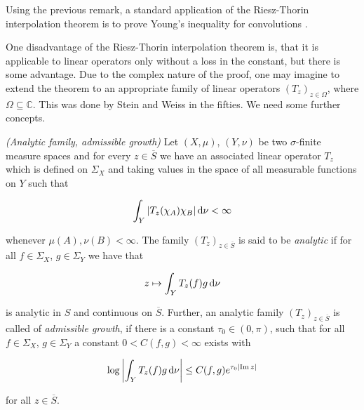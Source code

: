 \begin{remark*}
	Using the previous remark, a standard application of the Riesz-Thorin interpolation theorem is to prove Young's inequality for convolutions \textup{\cite[22--23]{grafakos:fourier:2014}}.
\end{remark*}

One disadvantage of the Riesz-Thorin interpolation theorem is, that it is applicable to linear operators only without a loss in the constant, but there is some advantage. Due to the complex nature of the proof, one may imagine to extend the theorem to an appropriate family of linear operators $\left( T_z \right)_{z \in \Omega}$, where $\Omega \subseteq \mathbb{C}$. This was done by Stein and Weiss in the fifties. We need some further concepts.

\vspace{2mm}

\begin{mdframed}
	\begin{definition}\emph{(Analytic family, admissible growth)}
		Let $(X,\mu)$, $(Y,\nu)$ be two $\sigma$-finite measure spaces and for every $z \in \overline{S}$ we have an associated linear operator $T_z$ which is defined on $\Sigma_X$ and taking values in the space of all measurable functions on $Y$ such that

		\begin{equation*}
			\int_Y \left| T_z(\chi_A)\chi_B \right| \mathop{}\!\mathrm{d}\nu < \infty
		\end{equation*}

		\noindent whenever $\mu(A),\nu(B) < \infty$. The family $\left( T_z \right)_{z \in \overline{S}}$ is said to be \emph{analytic} if for all $f \in \Sigma_X$, $g \in \Sigma_Y$ we have that

		\begin{equation*}
			z \mapsto \int_Y T_z(f)g\mathop{}\!\mathrm{d}\nu
		\end{equation*}

		\noindent is analytic in $S$ and continuous on $\overline{S}$. Further, an analytic family $\left( T_z \right)_{z \in \overline{S}}$ is called of \emph{admissible growth}, if there is a constant $\tau_0 \in (0,\pi)$, such that for all $f \in \Sigma_X$, $g \in \Sigma_Y$ a constant $0 < C(f,g) < \infty$ exists with

			\begin{equation*}
				\log\left| \int_Y T_z(f) g \mathop{}\!\mathrm{d}\nu\right| \leq C(f,g)e^{\tau_0\left| \operatorname{Im} z\right|}
			\end{equation*}

			\noindent for all $z \in \overline{S}$.
	\end{definition}
\end{mdframed}

